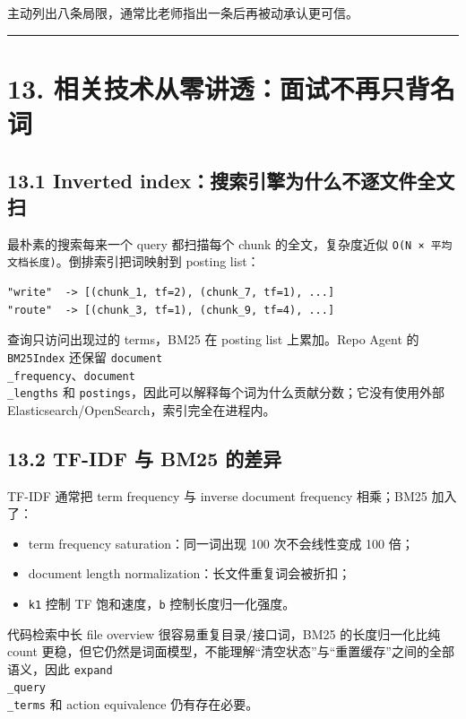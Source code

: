 \documentclass[UTF8,12pt,openany]{ctexbook}
\begin{document}
主动列出八条局限，通常比老师指出一条后再被动承认更可信。\par

\hrule

\section{13. 相关技术从零讲透：面试不再只背名词}

\subsection{13.1 Inverted index：搜索引擎为什么不逐文件全文扫}

最朴素的搜索每来一个 query 都扫描每个 chunk 的全文，复杂度近似 \texttt{O(N × 平均文档长度)}。倒排索引把词映射到 posting list：\par

\begin{lstlisting}
"write"  -> [(chunk_1, tf=2), (chunk_7, tf=1), ...]
"route"  -> [(chunk_3, tf=1), (chunk_9, tf=4), ...]
\end{lstlisting}

查询只访问出现过的 terms，BM25 在 posting list 上累加。Repo Agent 的 \texttt{BM25Index} 还保留 \texttt{document\\_frequency}、\texttt{document\\_lengths} 和 \texttt{postings}，因此可以解释每个词为什么贡献分数；它没有使用外部 Elasticsearch/OpenSearch，索引完全在进程内。\par

\subsection{13.2 TF-IDF 与 BM25 的差异}

TF-IDF 通常把 term frequency 与 inverse document frequency 相乘；BM25 加入了：\par

\begin{itemize}
\item term frequency saturation：同一词出现 100 次不会线性变成 100 倍；
\item document length normalization：长文件重复词会被折扣；
\item \texttt{k1} 控制 TF 饱和速度，\texttt{b} 控制长度归一化强度。
\end{itemize}

代码检索中长 file overview 很容易重复目录/接口词，BM25 的长度归一化比纯 count 更稳，但它仍然是词面模型，不能理解“清空状态”与“重置缓存”之间的全部语义，因此 \texttt{expand\\_query\\_terms} 和 action equivalence 仍有存在必要。\par
\end{document}
